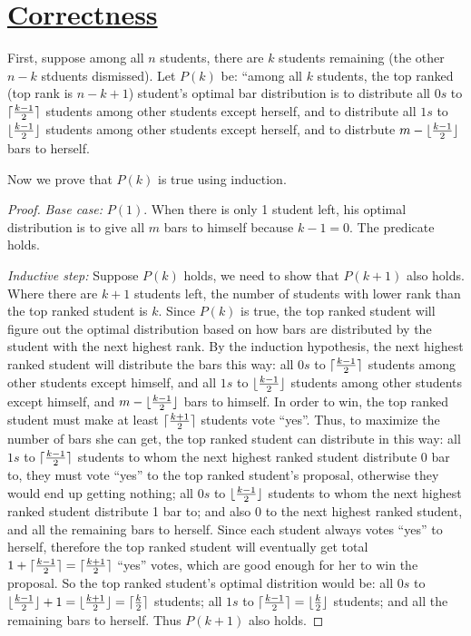 \documentclass[11pt]{article}
\DeclarePairedDelimiter\ceil{\lceil}{\rceil}
\DeclarePairedDelimiter\floor{\lfloor}{\rfloor}
\begin{document}
\section*{\underline{Correctness}}
First, suppose among all $n$ students, there are $k$ students
remaining (the other $n-k$ stduents dismissed). Let $P(k)$ be: ``among
all $k$ students, the top ranked (top rank is $n-k+1$) student's
optimal bar distribution is 
to distribute all $0s$ to $\ceil{\frac{k-1}{2}}$ students among other
students except herself, and to
distribute all $1s$ to $\floor{\frac{k-1}{2}}$ students among other
students except herself, and to distrbute $m-\floor{\frac{k-1}{2}}$ bars
to herself.

Now we prove that $P(k)$ is true using induction.
\begin{proof}
  \emph{Base case:} $P(1)$. When there is only 1 student left, his
  optimal distribution is to give all $m$ bars to himself because
  $k-1=0$. The predicate holds.

  \emph{Inductive step:} Suppose $P(k)$ holds, we need to show that
  $P(k+1)$ also holds. Where there are $k+1$ students left, the number
  of students with lower rank than the top ranked student is
  $k$. Since $P(k)$ is true, the top ranked student will figure out
  the optimal distribution based on how bars are distributed by the student
  with the next highest rank. By the induction hypothesis, the next
  highest ranked student will distribute the bars this way: all $0s$
  to $\ceil{\frac{k-1}{2}}$ students among other students except
  himself, and all $1s$ to $\floor{\frac{k-1}{2}}$
  students among other students except himself, and
  $m-\floor{\frac{k-1}{2}}$ bars to himself. In order to win,
  the top ranked student must make at least $\ceil{\frac{k+1}{2}}$
  students vote ``yes''. Thus, to maximize the number of bars she can
  get, the top ranked student can distribute in this way: all $1s$ to
  $\ceil{\frac{k-1}{2}}$ students to whom the next highest ranked
  student distribute 0 bar to, they must vote ``yes'' to the top
  ranked student's proposal, otherwise they would end up getting
  nothing; all $0s$ to $\floor{\frac{k-1}{2}}$ students to whom the
  next highest ranked student distribute 1 bar to; and also $0$ to the
  next highest ranked student, and all the remaining bars to
  herself. Since each student always votes ``yes'' 
  to herself, therefore the top ranked student will eventually get
  total $1+\ceil{\frac{k-1}{2}} = \ceil{\frac{k+1}{2}}$ ``yes'' votes,
  which are good enough for her to win the proposal. So the top ranked
  student's optimal distrition would be: all $0s$ to
  $\floor{\frac{k-1}{2}} + 1 = \floor{\frac{k+1}{2}} =
  \ceil{\frac{k}{2}}$ students; all $1s$ to $\ceil{\frac{k-1}{2}} = 
    \floor{\frac{k}{2}}$ students; and all the remaining bars to
    herself. Thus $P(k+1)$ also holds. 

\end{proof}
\end{document}
